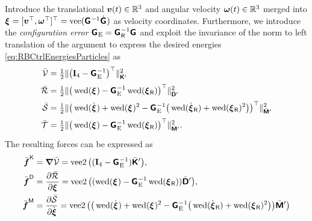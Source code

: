 Introduce the translational $\boldsymbol{v}(t) \in \mathbb{R}^3$ and angular velocity $\boldsymbol{\omega}(t)\in \mathbb{R}^3$ merged into $\bodyVel{}{} = [\v^\top, \w^\top]^\top = \veeOp(\bodyHomoCoord{}{}^{-1} \bodyHomoCoordd{}{})$ as velocity coordinates.
Furthermore, we introduce the \textit{configuration error} $\bodyHomoCoordE{}{} = \bodyHomoCoordR{}{}^{-1} \bodyHomoCoord{}{}$ and exploit the invariance of the norm to left translation of the argument to express the desired energies \eqref{eq:RBCtrlEnergiesParticles} as
\begin{subequations}\label{eq:CtrlApproachParticleRBEnergies}
\begin{align}
 \potentialEnergyC &= \tfrac{1}{2} \norm[\bodyStiffMatCp{}{}]{\big(\idMat[4] - \bodyHomoCoordE{}{}^{-1}\big)^\top}^2
\\
 \dissFktC &= \tfrac{1}{2} \norm[\bodyDissMatCp{}{}]{\big(\wedOp(\bodyVel{}{}) - \bodyHomoCoordE{}{}^{-1} \wedOp(\bodyVelR{}{}) \big)^\top}^2
\\
 \accEnergyC &= \tfrac{1}{2} \norm[\bodyInertiaMatCp{}{}]{\big(\wedOp(\bodyVeld{}{}) + \wedOp(\bodyVel{}{})^2 - \bodyHomoCoordE{}{}^{-1} \big( \wedOp(\bodyVelRd{}{}) + \wedOp(\bodyVelR{}{})^2 \big)\big)^\top}^2
\\
 \kineticEnergyC &= \tfrac{1}{2} \norm[\bodyInertiaMatCp{}{}]{\big(\wedOp(\bodyVel{}{}) - \bodyHomoCoordE{}{}^{-1} \wedOp(\bodyVelR{}{}) \big)^\top}^2
 .
\end{align}
\end{subequations}
The resulting forces can be expressed as
\begin{subequations}\label{eq:RBCtrlParticles}
\begin{align}
 \genForceStiffC
 &= \differential \potentialEnergyC
 = \veeTwoOp \big( (\idMat[4] - \bodyHomoCoordE{}{}^{-1}) \bodyStiffMatCp{}{} \big),
 \label{eq:GenForceStiffRigidBodyCtrl}
\\
 \genForceDissC
 &= \pdiff[\dissFktC]{\sysVel}
 = \veeTwoOp \big( (\wedOp(\bodyVel{}{}) - \bodyHomoCoordE{}{}^{-1} \wedOp(\bodyVelR{}{})) \bodyDissMatCp{}{} \big),
\\
 \genForceInertiaC
 &= \pdiff[\accEnergyC]{\sysVeld}
 = \veeTwoOp \big( \big(\wedOp(\bodyVeld{}{}) + \wedOp(\bodyVel{}{})^2 - \bodyHomoCoordE{}{}^{-1} \big( \wedOp(\bodyVelRd{}{}) + \wedOp(\bodyVelR{}{})^2 \big) \big) \bodyInertiaMatCp{}{} \big) 
\end{align}
\end{subequations}
